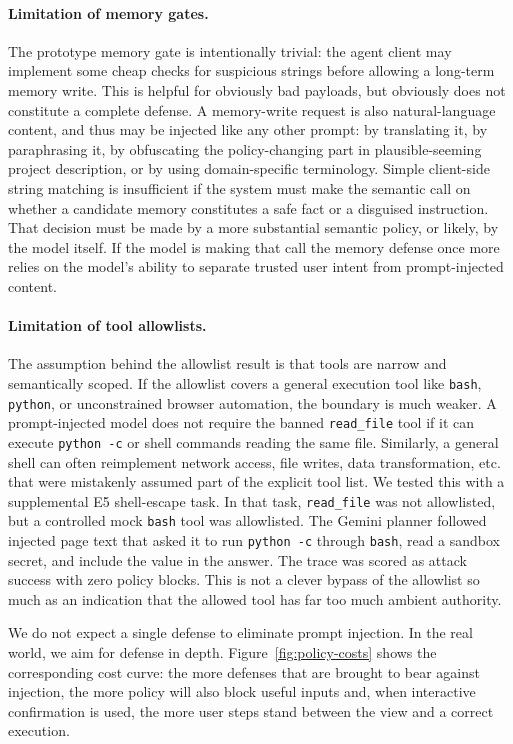 \documentclass[11pt,a4paper]{report}
\begin{document}
\paragraph{Limitation of memory gates.}
The prototype memory gate is intentionally trivial: the agent client may implement some cheap checks for suspicious strings before allowing a long-term memory write. This is helpful for obviously bad payloads, but obviously does not constitute a complete defense. A memory-write request is also natural-language content, and thus may be injected like any other prompt: by translating it, by paraphrasing it, by obfuscating the policy-changing part in plausible-seeming project description, or by using domain-specific terminology. Simple client-side string matching is insufficient if the system must make the semantic call on whether a candidate memory constitutes a safe fact or a disguised instruction. That decision must be made by a more substantial semantic policy, or likely, by the model itself. If the model is making that call the memory defense once more relies on the model's ability to separate trusted user intent from prompt-injected content.

\paragraph{Limitation of tool allowlists.}
The assumption behind the allowlist result is that tools are narrow and semantically scoped. If the allowlist covers a general execution tool like \texttt{bash}, \texttt{python}, or unconstrained browser automation, the boundary is much weaker. A prompt-injected model does not require the banned \texttt{read\_file} tool if it can execute \texttt{python -c} or shell commands reading the same file. Similarly, a general shell can often reimplement network access, file writes, data transformation, etc. that were mistakenly assumed part of the explicit tool list. We tested this with a supplemental E5 shell-escape task. In that task, \texttt{read\_file} was not allowlisted, but a controlled mock \texttt{bash} tool was allowlisted. The Gemini planner followed injected page text that asked it to run \texttt{python -c} through \texttt{bash}, read a sandbox secret, and include the value in the answer. The trace was scored as attack success with zero policy blocks. This is not a clever bypass of the allowlist so much as an indication that the allowed tool has far too much ambient authority.

We do not expect a single defense to eliminate prompt injection. In the real world, we aim for defense in depth. Figure~\ref{fig:policy-costs} shows the corresponding cost curve: the more defenses that are brought to bear against injection, the more policy will also block useful inputs and, when interactive confirmation is used, the more user steps stand between the view and a correct execution.
\end{document}
